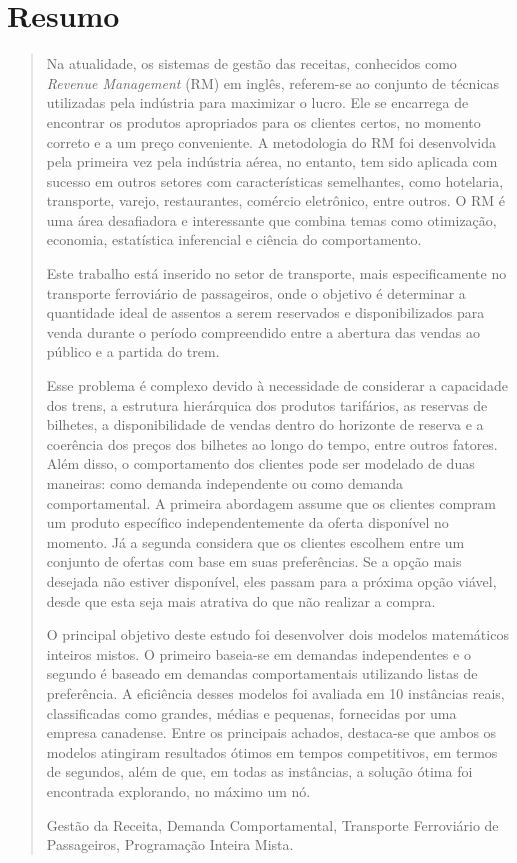 \chapter*{Resumo}

\vspace{-1.0cm}
\begin{quotation}
	Na atualidade, os sistemas de gestão das receitas, conhecidos como { \it Revenue Management} (RM) em inglês, referem-se ao conjunto de técnicas utilizadas pela indústria para maximizar o lucro. Ele se encarrega de encontrar os produtos apropriados para os clientes certos, no momento correto e a um preço conveniente. A metodologia do RM foi desenvolvida pela primeira vez pela indústria aérea, no entanto, tem sido aplicada com sucesso em outros setores com características semelhantes, como hotelaria, transporte, varejo, restaurantes, comércio eletrônico, entre outros. O RM é uma área desafiadora e interessante que combina temas como otimização, economia, estatística inferencial e ciência do comportamento.

	Este trabalho está inserido no setor de transporte, mais especificamente no transporte ferroviário de passageiros, onde o objetivo é determinar a quantidade ideal de assentos a serem reservados e disponibilizados para venda durante o período compreendido entre a abertura das vendas ao público e a partida do trem.

	Esse problema é complexo devido à necessidade de considerar a capacidade dos trens, a estrutura hierárquica dos produtos tarifários, as reservas de bilhetes, a disponibilidade de vendas dentro do horizonte de reserva e a coerência dos preços dos bilhetes ao longo do tempo, entre outros fatores. Além disso, o comportamento dos clientes pode ser modelado de duas maneiras: como demanda independente ou como demanda comportamental. A primeira abordagem assume que os clientes compram um produto específico independentemente da oferta disponível no momento. Já a segunda considera que os clientes escolhem entre um conjunto de ofertas com base em suas preferências. Se a opção mais desejada não estiver disponível, eles passam para a próxima opção viável, desde que esta seja mais atrativa do que não realizar a compra.

	O principal objetivo deste estudo foi desenvolver dois modelos matemáticos inteiros mistos. O primeiro baseia-se em demandas independentes e o segundo é baseado em demandas comportamentais utilizando listas de preferência. A eficiência desses modelos foi avaliada em 10 instâncias reais, classificadas como grandes, médias e pequenas, fornecidas por uma empresa canadense. Entre os principais achados, destaca-se que ambos os modelos atingiram resultados ótimos em tempos competitivos, em termos de segundos, além de que, em todas as instâncias, a solução ótima foi encontrada explorando, no máximo um nó.

	\vspace{0.5cm}

	 Gestão da Receita, Demanda Comportamental, Transporte Ferroviário de Passageiros, Programação Inteira Mista.
\end{quotation}

